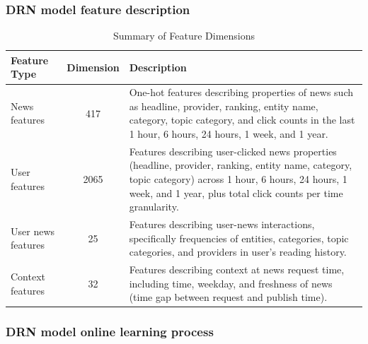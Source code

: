 \documentclass{ieeetj}
\begin{document}
\FloatBarrier
\subsubsection{DRN model feature description}

\begin{table}[ht]
    \centering
    \caption{Summary of Feature Dimensions}
    \begin{tabularx}{\columnwidth}{|l|c|X|}
    \hline
    \textbf{Feature Type} & \textbf{Dimension} & \textbf{Description} \\ \hline
    News features & 417 & One-hot features describing properties of news such as headline, provider, ranking, entity name, category, topic category, and click counts in the last 1 hour, 6 hours, 24 hours, 1 week, and 1 year. \\ \hline
    User features & 2065 & Features describing user-clicked news properties (headline, provider, ranking, entity name, category, topic category) across 1 hour, 6 hours, 24 hours, 1 week, and 1 year, plus total click counts per time granularity. \\ \hline
    User news features & 25 & Features describing user-news interactions, specifically frequencies of entities, categories, topic categories, and providers in user's reading history. \\ \hline
    Context features & 32 & Features describing context at news request time, including time, weekday, and freshness of news (time gap between request and publish time). \\ \hline
    \end{tabularx}
    \label{tab:feature-summary}
\end{table}


\FloatBarrier
\subsubsection{DRN model online learning process}

\end{document}
